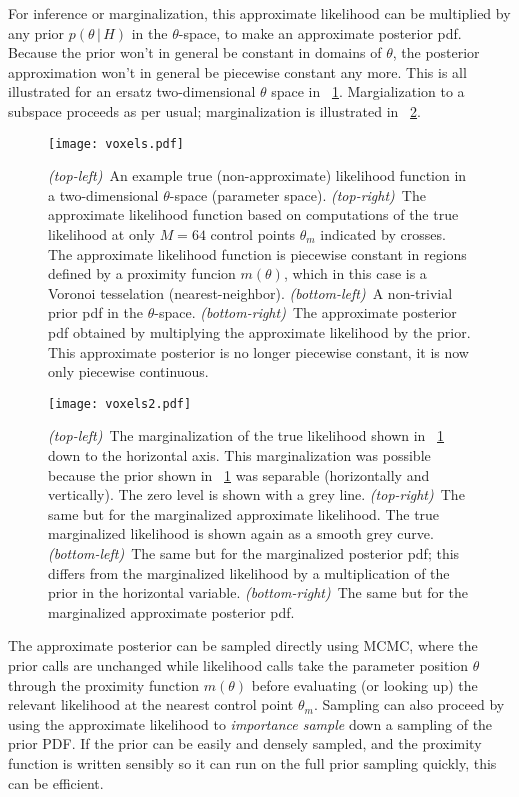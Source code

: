 \documentclass[12pt]{article}
\newcommand{\given}{\,|\,}
\begin{document}
For inference or marginalization, this approximate likelihood can be
multiplied by any prior $p(\theta\given H)$ in the $\theta$-space, to
make an approximate posterior pdf.  Because the prior won't in general
be constant in domains of $\theta$, the posterior approximation won't
in general be piecewise constant any more.  This is all illustrated
for an ersatz two-dimensional $\theta$ space in
\figurename~\ref{fig:posterior}.  Margialization to a subspace
proceeds as per usual; marginalization is illustrated in
\figurename~\ref{fig:marginal}.

\begin{figure}[p]
\texttt{[image: voxels.pdf]}
\caption{\textsl{(top-left)}~An example true (non-approximate)
  likelihood function in a two-dimensional $\theta$-space (parameter
  space). \textsl{(top-right)}~The approximate likelihood function
  based on computations of the true likelihood at only $M=64$ control
  points $\theta_m$ indicated by crosses.  The approximate likelihood
  function is piecewise constant in regions defined by a proximity
  funcion $m(\theta)$, which in this case is a Voronoi tesselation
  (nearest-neighbor).  \textsl{(bottom-left)}~A non-trivial prior pdf
  in the $\theta$-space.  \textsl{(bottom-right)}~The approximate
  posterior pdf obtained by multiplying the approximate likelihood by
  the prior.  This approximate posterior is no longer piecewise
  constant, it is now only piecewise continuous.\label{fig:posterior}}
\end{figure}

\begin{figure}[p]
\texttt{[image: voxels2.pdf]}
\caption{\textsl{(top-left)}~The marginalization of the true
  likelihood shown in \figurename~\ref{fig:posterior} down to the
  horizontal axis.  This marginalization was possible because the
  prior shown in \figurename~\ref{fig:posterior} was separable
  (horizontally and vertically).  The zero level is shown with a grey
  line.  \textsl{(top-right)}~The same but for the marginalized
  approximate likelihood.  The true marginalized likelihood is shown
  again as a smooth grey curve.  \textsl{(bottom-left)}~The same but
  for the marginalized posterior pdf; this differs from the
  marginalized likelihood by a multiplication of the prior in the
  horizontal variable.  \textsl{(bottom-right)}~The same but for the
  marginalized approximate posterior pdf.\label{fig:marginal}}
\end{figure}

The approximate posterior can be sampled directly using MCMC, where
the prior calls are unchanged while likelihood calls take the
parameter position $\theta$ through the proximity function $m(\theta)$
before evaluating (or looking up) the relevant likelihood at the
nearest control point $\theta_m$.  Sampling can also proceed by using
the approximate likelihood to \emph{importance sample} down a sampling
of the prior PDF.  If the prior can be easily and densely sampled, and
the proximity function is written sensibly so it can run on the full
prior sampling quickly, this can be efficient.
\end{document}
